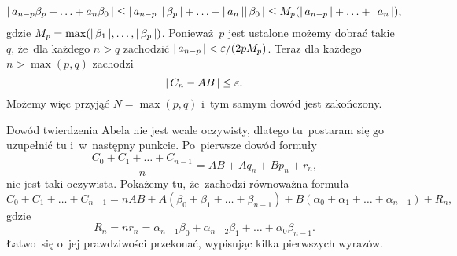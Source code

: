 \documentclass[a4paper,11pt]{article}
\begin{document}
\begin{equation}
  \label{eq:Leja-Funkcje-zespolone-17}
  |\, {  a_{ n - p } \beta_{ p } + \ldots + a_{ n } \beta_{ 0 }  } \,| \leq
  |\, {  a_{ n - p }  } \,| |\, {  \beta_{ p }  } \,| + \ldots + |\, {  a_{ n }  } \,|
  |\, {  \beta_{ 0 }  } \,| \leq
  M_{ p } ( |\, {  a_{ n - p }  } \,| + \ldots + |\, {  a_{ n }  } \,| ),
\end{equation}
gdzie
$M_{ p } = \max( |\, {  \beta_{ 1 }  } \,|, \ldots, |\, {  \beta_{ p }  } \,| )$.
Ponieważ~$p$ jest ustalone możemy dobrać takie $q$, że~dla każdego
$n > q$ zachodzić
$|\, {  a_{ n - p }  } \,| < \varepsilon / ( 2 p M_{ p } )$. Teraz dla każdego
$n > \max( p, q )$ zachodzi
\begin{equation}
  \label{eq:Leja-Funkcje-zespolone-18}
  |\, {  C_{ n } - AB  } \,| \leq \varepsilon.
\end{equation}
Możemy więc przyjąć $N = \max( p, q )$ i~tym samym dowód jest
zakończony.

\vspace{\spaceFour}





\noindent
{} Dowód twierdzenia Abela nie jest wcale oczywisty, dlatego
tu~postaram się go uzupełnić tu i~w~następny punkcie. Po~pierwsze dowód
formuły
\begin{equation}
  \label{eq:Leja-Funkcje-zespolone-19}
  \frac{ C_{ 0 } + C_{ 1 } + \ldots + C_{ n - 1 } }{ n }
  = AB + A q_{ n } + B p_{ n } + r_{ n },
\end{equation}
nie jest taki oczywista. Pokażemy tu, że~zachodzi równoważna formuła
\begin{equation}
  \label{eq:Leja-Funkcje-zespolone-20}
  C_{ 0 } + C_{ 1 } + \ldots + C_{ n - 1 }
  = n AB + A ( \beta_{ 0 } + \beta_{ 1 } + \ldots + \beta_{ n - 1 } )
  + B ( \alpha_{ 0 } + \alpha_{ 1 } + \ldots + \alpha_{ n - 1 } ) + R_{ n },
\end{equation}
gdzie
\begin{equation}
  \label{eq:Leja-Funkcje-zespolone-21}
  R_{ n } = n r_{ n } =
  \alpha_{ n - 1 } \beta_{ 0 } + \alpha_{ n - 2 } \beta_{ 1 } + \ldots + \alpha_{ 0 } \beta_{ n - 1 }.
\end{equation}
Łatwo~się o~jej prawdziwości przekonać, wypisując kilka pierwszych
wyrazów.
\end{document}
